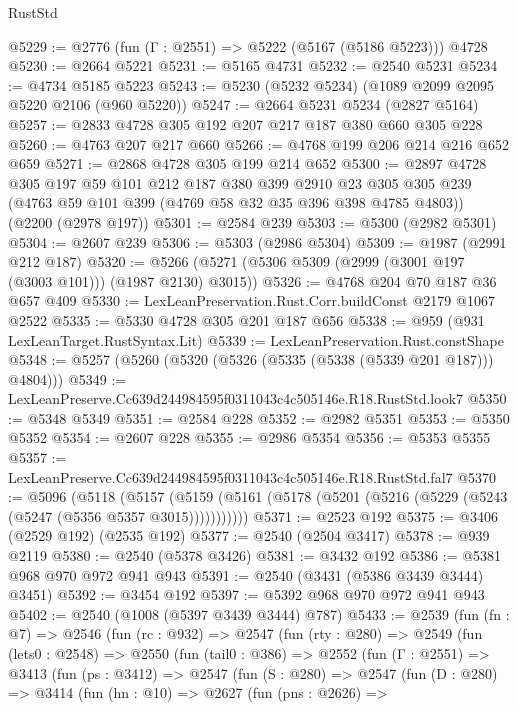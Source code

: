 \begin{lexlean}{RustStd}
\begin{coremodule}
@5229 := @2776 (fun (Γ : @2551) => @5222 (@5167 (@5186 @5223))) @4728
@5230 := @2664 @5221
@5231 := @5165 @4731
@5232 := @2540 @5231
@5234 := @4734 @5185 @5223
@5243 := @5230 (@5232 @5234) (@1089 @2099 @2095 @5220 @2106 (@960 @5220))
@5247 := @2664 @5231 @5234 (@2827 @5164)
@5257 := @2833 @4728 @305 @192 @207 @217 @187 @380 @660 @305 @228
@5260 := @4763 @207 @217 @660
@5266 := @4768 @199 @206 @214 @216 @652 @659
@5271 := @2868 @4728 @305 @199 @214 @652
@5300 := @2897
    @4728
    @305
    @197
    @59
    @101
    @212
    @187
    @380
    @399
    @2910
    @23
    @305
    @305
    @239
    (@4763 @59 @101 @399 (@4769 @58 @32 @35 @396 @398 @4785 @4803))
    (@2200 (@2978 @197))
@5301 := @2584 @239
@5303 := @5300 (@2982 @5301)
@5304 := @2607 @239
@5306 := @5303 (@2986 @5304)
@5309 := @1987 (@2991 @212 @187)
@5320 := @5266 (@5271 (@5306 @5309 (@2999 (@3001 @197 (@3003 @101))) (@1987 @2130) @3015))
@5326 := @4768 @204 @70 @187 @36 @657 @409
@5330 := LexLeanPreservation.Rust.Corr.buildConst @2179 @1067 @2522
@5335 := @5330 @4728 @305 @201 @187 @656
@5338 := @959 (@931 LexLeanTarget.RustSyntax.Lit)
@5339 := LexLeanPreservation.Rust.constShape
@5348 := @5257 (@5260 (@5320 (@5326 (@5335 (@5338 (@5339 @201 @187))) @4804)))
@5349 := LexLeanPreserve.Cc639d244984595f0311043c4c505146e.R18.RustStd.look7
@5350 := @5348 @5349
@5351 := @2584 @228
@5352 := @2982 @5351
@5353 := @5350 @5352
@5354 := @2607 @228
@5355 := @2986 @5354
@5356 := @5353 @5355
@5357 := LexLeanPreserve.Cc639d244984595f0311043c4c505146e.R18.RustStd.fal7
@5370 := @5096
    (@5118
      (@5157 (@5159 (@5161 (@5178 (@5201 (@5216 (@5229 (@5243 (@5247 (@5356 @5357 @3015)))))))))))
@5371 := @2523 @192
@5375 := @3406 (@2529 @192) (@2535 @192)
@5377 := @2540 (@2504 @3417)
@5378 := @939 @2119
@5380 := @2540 (@5378 @3426)
@5381 := @3432 @192
@5386 := @5381 @968 @970 @972 @941 @943
@5391 := @2540 (@3431 (@5386 @3439 @3444) @3451)
@5392 := @3454 @192
@5397 := @5392 @968 @970 @972 @941 @943
@5402 := @2540 (@1008 (@5397 @3439 @3444) @787)
@5433 := @2539
    (fun (fn : @7) =>
    @2546
      (fun (rc : @932) =>
      @2547
        (fun (rty : @280) =>
        @2549
          (fun (lets0 : @2548) =>
          @2550
            (fun (tail0 : @386) =>
            @2552
              (fun (Γ : @2551) =>
              @3413
                (fun (ps : @3412) =>
                @2547
                  (fun (S : @280) =>
                  @2547
                    (fun (D : @280) =>
                    @3414
                      (fun (hn : @10) =>
                      @2627
                        (fun (pns : @2626) =>

\end{coremodule}
\end{lexlean}
